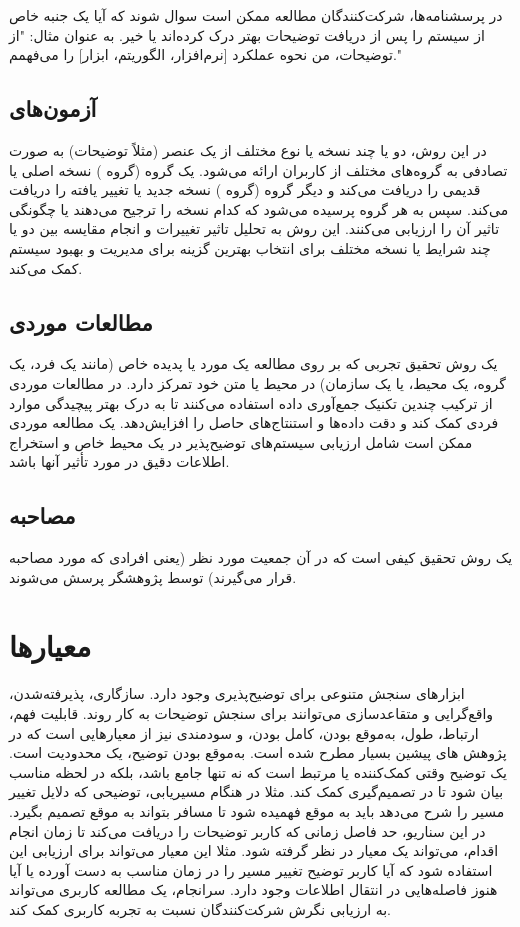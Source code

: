 در پرسشنامه‌ها، شرکت‌کنندگان مطالعه ممکن است سوال شوند که آیا یک جنبه خاص از
سیستم را پس از دریافت توضیحات بهتر درک کرده‌اند یا خیر. به عنوان مثال: "از
توضیحات، من نحوه عملکرد [نرم‌افزار، الگوریتم، ابزار] را می‌فهمم."

\subsection{آزمون‌های }

در این روش، دو یا چند نسخه یا نوع مختلف از یک عنصر (مثلاً توضیحات) به صورت
تصادفی به گروه‌های مختلف از کاربران ارائه می‌شود. یک گروه (گروه ) نسخه
اصلی یا قدیمی را دریافت می‌کند و دیگر گروه (گروه ) نسخه جدید یا تغییر
یافته را دریافت می‌کند. سپس به هر گروه پرسیده می‌شود که کدام نسخه را ترجیح
می‌دهند یا چگونگی تاثیر آن را ارزیابی می‌کنند. این روش به تحلیل تاثیر تغییرات و
انجام مقایسه بین دو یا چند شرایط یا نسخه مختلف برای انتخاب بهترین گزینه برای
مدیریت و بهبود سیستم کمک می‌کند.

\subsection{مطالعات موردی}

یک روش تحقیق تجربی که بر روی مطالعه یک مورد یا پدیده خاص (مانند یک فرد، یک گروه،
یک محیط، یا یک سازمان) در محیط یا متن خود تمرکز دارد. در مطالعات موردی از ترکیب
چندین تکنیک جمع‌آوری داده استفاده می‌کنند تا به درک بهتر پیچیدگی موارد فردی کمک
کند و دقت داده‌ها و استنتاج‌های حاصل را افزایش‌دهد. یک مطالعه موردی ممکن است
شامل ارزیابی سیستم‌های توضیح‌پذیر در یک محیط خاص و استخراج اطلاعات دقیق در مورد
تأثیر آنها باشد.

\subsection{مصاحبه}

یک روش تحقیق کیفی است که در آن جمعیت مورد نظر (یعنی افرادی که مورد مصاحبه قرار
می‌گیرند) توسط پژوهشگر پرسش می‌شوند.

\section{معیارها}

ابزارهای سنجش متنوعی برای توضیح‌پذیری وجود دارد. سازگاری، پذیرفته‌شدن،
واقع‌گرایی و متقاعدسازی می‌توانند برای سنجش توضیحات به کار روند. قابلیت فهم،
ارتباط، طول، به‌موقع بودن، کامل بودن، و سودمندی نیز از معیارهایی است که در پژوهش
های پیشین بسیار مطرح شده است. به‌موقع بودن توضیح، یک محدودیت است. یک توضیح وقتی
کمک‌کننده یا مرتبط است که نه تنها جامع باشد، بلکه در لحظه‌ مناسب بیان شود تا در
تصمیم‌گیری کمک کند. مثلا در هنگام مسیریابی، توضیحی که دلایل تغییر مسیر را شرح
می‌دهد باید به موقع فهمیده شود تا مسافر بتواند به موقع تصمیم بگیرد. در این
سناریو، حد فاصل زمانی که کاربر توضیحات را دریافت می‌کند تا زمان انجام اقدام،
می‌تواند یک معیار در نظر گرفته شود. مثلا این معیار می‌تواند برای ارزیابی این
استفاده شود که آیا کاربر توضیح تغییر مسیر را در زمان مناسب به دست آورده یا آیا
هنوز فاصله‌هایی در انتقال اطلاعات وجود دارد. سرانجام، یک مطالعه کاربری می‌تواند
به ارزیابی نگرش شرکت‌کنندگان نسبت به تجربه کاربری کمک کند. 

